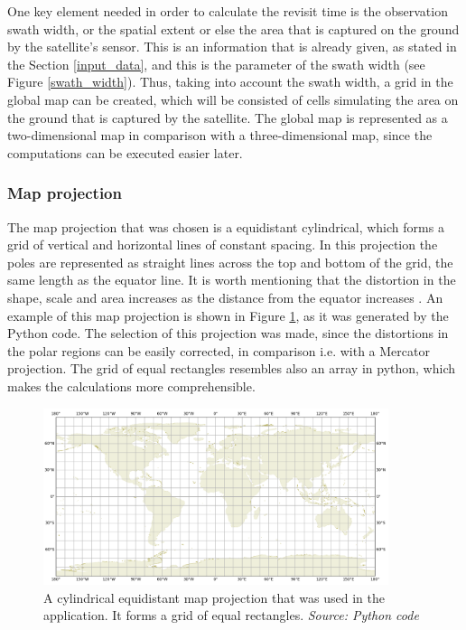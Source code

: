 One key element needed in order to calculate the revisit time is the observation swath width, or the spatial extent or else the area that is captured on the ground by the satellite's sensor. This is an information that is already given, as stated in the Section \ref{input_data}, and this is the parameter of the swath width (see Figure \ref{swath_width}). Thus, taking into account the swath width, a grid in the global map can be created, which will be consisted of cells simulating the area on the ground that is captured by the satellite. The global map is represented as a two-dimensional map in comparison with a three-dimensional map, since the computations can be executed easier later.

\bigskip
\subsubsection{Map projection}
\bigskip

The map projection that was chosen is a equidistant cylindrical, which forms a grid of vertical and horizontal lines of constant spacing. In this projection the poles are represented as straight lines across the top and bottom of the grid, the same length as the equator line. It is worth mentioning that the distortion in the shape, scale and area increases as the distance from the equator increases \cite{Lapaine}. An example of this map projection is shown in Figure \ref{map_projection}, as it was generated by the Python code. The selection of this projection was made, since the distortions in the polar regions can be easily corrected, in comparison i.e. with a Mercator projection. The grid of equal rectangles resembles also an array in python, which makes the calculations more comprehensible.

\begin{figure}
\centering
\includegraphics[width=0.9\textwidth]{Images/map_projection.png}\caption{A cylindrical equidistant map projection that was used in the application. It forms a grid of equal rectangles. \textit{Source: Python code}}
\label{map_projection}
\end{figure}


